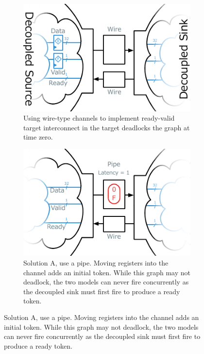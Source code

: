 \begin{figure}
    \centering
    \begin{subfigure}[t]{0.6\textwidth}
        \includegraphics[width=\textwidth]{figures/deadlock.pdf}
        \caption{Using wire-type channels to implement ready-valid target interconnect in the target deadlocks the graph at time zero.}
        \label{fig:default-target}
    \end{subfigure}\vspace{0.5cm}
    \begin{subfigure}[t]{0.48\textwidth}
        \includegraphics[width=\textwidth]{figures/pipe-decoupled-example.pdf}
        \caption{Solution A, use a pipe. Moving registers into the channel adds an initial token. While
        this graph may not deadlock, the two models can never fire concurrently
        as the decoupled sink must first fire to produce a ready token.}
        \label{fig:pipe-decoupled-example}
    \end{subfigure}\hspace{0.5cm}

\end{figure}

